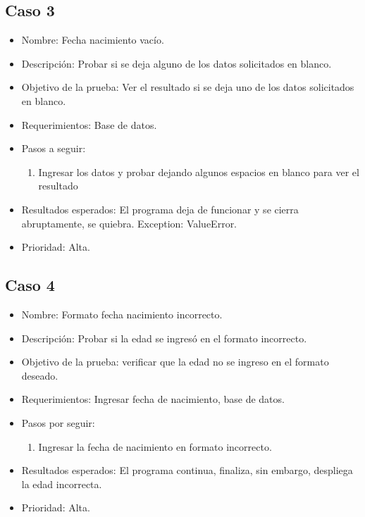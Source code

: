 \documentclass[conference]{IEEEtran}
\begin{document}
\subsection*{Caso 3}
\begin{itemize}
\item Nombre: Fecha nacimiento vacío. 
\item Descripción: Probar si se deja alguno de los datos solicitados en blanco.
\item Objetivo de la prueba: Ver el resultado si se deja uno de los datos solicitados en blanco. 
\item Requerimientos: Base de datos. 
\item Pasos a seguir:
\begin{enumerate}
\item Ingresar los datos y probar dejando algunos espacios en blanco para ver el resultado
\end{enumerate}
\item Resultados esperados: El programa deja de funcionar y se cierra abruptamente, se quiebra. Exception: ValueError.
\item Prioridad: Alta.
\end{itemize}
\subsection*{Caso 4}
\begin{itemize}
\item Nombre: Formato fecha nacimiento incorrecto. 
\item Descripción: Probar si la edad se ingresó en el formato incorrecto.
\item Objetivo de la prueba: verificar que la edad no se ingreso en el formato deseado. 
\item Requerimientos: Ingresar fecha de nacimiento, base de datos. 
\item Pasos por seguir: 
\begin{enumerate}
\item Ingresar la fecha de nacimiento en formato incorrecto.
\end{enumerate}
\item Resultados esperados: El programa continua, finaliza, sin embargo, despliega la edad incorrecta.
\item Prioridad: Alta.
\end{itemize}
\end{document}

